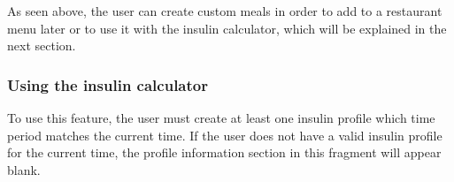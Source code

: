 As seen above, the user can create custom meals in order to add to a restaurant menu later or to use it 
with the insulin calculator, which will be explained in the next section.

\subsubsection{Using the insulin calculator}

To use this feature, the user must create at least one insulin profile which time period matches the current time. If the user does not have a valid insulin profile for the current
time, the profile information section in this fragment will appear blank.\\

\begin{figure}[H]
    \captionsetup[subfigure]{justification=centering}
    \begin{center}
        \begin{subfigure}{.3\textwidth}

\end{subfigure}
\end{center}
\end{figure}
